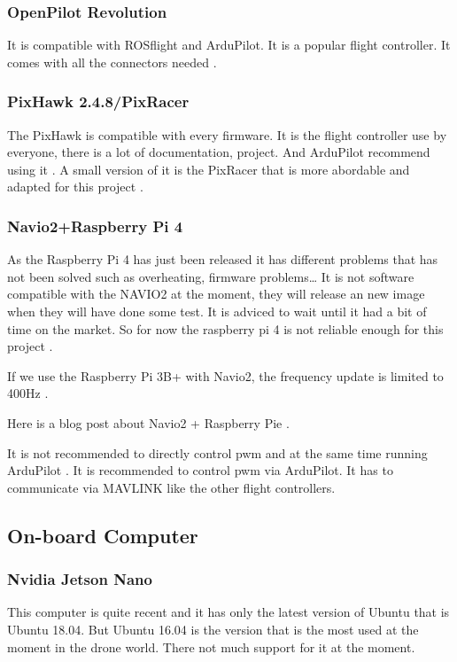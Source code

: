 \subsubsection{OpenPilot Revolution}
It is compatible with ROSflight and ArduPilot. It is a popular flight controller.
It comes with all the connectors needed \cite{bangood_revo}.


\subsubsection{PixHawk 2.4.8/PixRacer}
The PixHawk is compatible with every firmware.
It is the flight controller use by everyone, there is a lot of documentation, project. And ArduPilot recommend using it \cite{ardupilot_choose_fc}.
A small version of it is the PixRacer that is more abordable and adapted for this project \cite{mrobotics_pixracer}.

\subsubsection{Navio2+Raspberry Pi 4}
As the Raspberry Pi 4 has just been released it has different problems that has not been solved such as overheating, firmware problems… It is not software compatible with the NAVIO2 at the moment, they will release an new image when they will have done some test. It is adviced to wait until it had a bit of time on the market. So for now the raspberry pi 4 is not reliable enough for this project \cite{ardupilot_rpi_compatibility}.

If we use the Raspberry Pi 3B+ with Navio2, the frequency update is limited to 400Hz \cite{emlid_pwm_frequency}.

Here is a blog post about Navio2 + Raspberry Pie \cite{dojofordrones_rpi_drone}.

It is not recommended to directly control pwm and at the same time running ArduPilot \cite{emlid_servo_control}. It is recommended to control pwm via ArduPilot. It has to communicate via MAVLINK like the other flight controllers.

\subsection{On-board Computer}
\subsubsection{Nvidia Jetson Nano}
This computer is quite recent and it has only the latest version of Ubuntu that is Ubuntu 18.04.
But Ubuntu 16.04 is the version that is the most used at the moment in the drone world.
There not much support for it at the moment.

